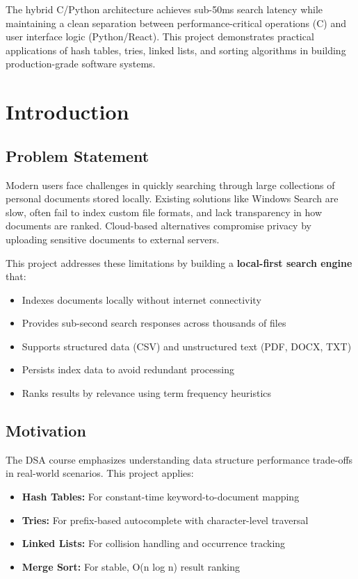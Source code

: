 \documentclass[12pt,a4paper]{article}
\begin{document}
The hybrid C/Python architecture achieves sub-50ms search latency while maintaining a clean separation between performance-critical operations (C) and user interface logic (Python/React). This project demonstrates practical applications of hash tables, tries, linked lists, and sorting algorithms in building production-grade software systems.

\newpage
\tableofcontents

\newpage
\section{Introduction}

\subsection{Problem Statement}
Modern users face challenges in quickly searching through large collections of personal documents stored locally. Existing solutions like Windows Search are slow, often fail to index custom file formats, and lack transparency in how documents are ranked. Cloud-based alternatives compromise privacy by uploading sensitive documents to external servers.

This project addresses these limitations by building a \textbf{local-first search engine} that:
\begin{itemize}
    \item Indexes documents locally without internet connectivity
    \item Provides sub-second search responses across thousands of files
    \item Supports structured data (CSV) and unstructured text (PDF, DOCX, TXT)
    \item Persists index data to avoid redundant processing
    \item Ranks results by relevance using term frequency heuristics
\end{itemize}

\subsection{Motivation}
The DSA course emphasizes understanding data structure performance trade-offs in real-world scenarios. This project applies:
\begin{itemize}
    \item \textbf{Hash Tables:} For constant-time keyword-to-document mapping
    \item \textbf{Tries:} For prefix-based autocomplete with character-level traversal
    \item \textbf{Linked Lists:} For collision handling and occurrence tracking
    \item \textbf{Merge Sort:} For stable, O(n log n) result ranking
\end{itemize}
\end{document}
